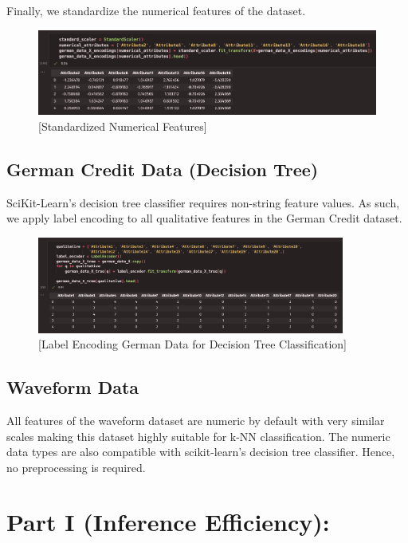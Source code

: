 \documentclass{article}
\begin{document}
    \newpage

    Finally, we standardize the numerical features of the dataset.
    \begin{figure}[H]
        \centering
        \includegraphics[width=\textwidth, height=0.2\textheight]{./I_1_g_i.png}
        \caption{[Standardized Numerical Features]}
    \end{figure}

    \subsection*{German Credit Data (Decision Tree)}

    SciKit-Learn's decision tree classifier requires non-string feature values. As such, we apply label encoding to all qualitative features in the German Credit dataset.
    \begin{figure}[H]
        \centering
        \includegraphics[width=0.9\textwidth, height=0.2\textheight]{./I_1_g_j.png}
        \caption{[Label Encoding German Data for Decision Tree Classification]}
    \end{figure}

    \subsection*{Waveform Data}

    All features of the waveform dataset are numeric by default with very similar scales making this dataset highly suitable for k-NN classification. The numeric data types
    are also compatible with scikit-learn's decision tree classifier. Hence, no preprocessing is required.

    \section*{Part I (Inference Efficiency):}
\end{document}
